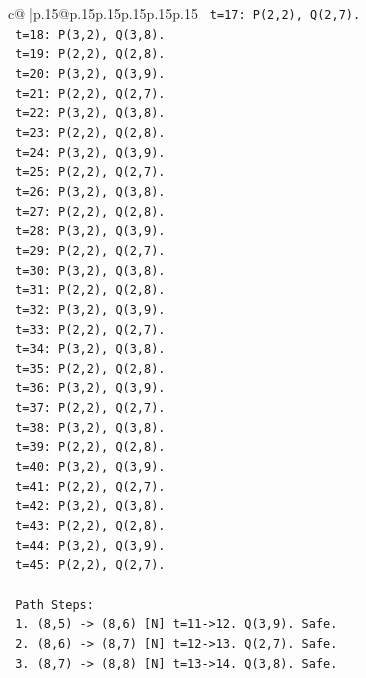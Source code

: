 \documentclass{article}
\begin{document}
{\begin{supertabular}{c@{$\;$}|p{.15\linewidth}@{}p{.15\linewidth}p{.15\linewidth}p{.15\linewidth}p{.15\linewidth}p{.15\linewidth}}
{{{\texttt{  t=17: P(2,2), Q(2,7).} \\
\texttt{  t=18: P(3,2), Q(3,8).} \\
\texttt{  t=19: P(2,2), Q(2,8).} \\
\texttt{  t=20: P(3,2), Q(3,9).} \\
\texttt{  t=21: P(2,2), Q(2,7).} \\
\texttt{  t=22: P(3,2), Q(3,8).} \\
\texttt{  t=23: P(2,2), Q(2,8).} \\
\texttt{  t=24: P(3,2), Q(3,9).} \\
\texttt{  t=25: P(2,2), Q(2,7).} \\
\texttt{  t=26: P(3,2), Q(3,8).} \\
\texttt{  t=27: P(2,2), Q(2,8).} \\
\texttt{  t=28: P(3,2), Q(3,9).} \\
\texttt{  t=29: P(2,2), Q(2,7).} \\
\texttt{  t=30: P(3,2), Q(3,8).} \\
\texttt{  t=31: P(2,2), Q(2,8).} \\
\texttt{  t=32: P(3,2), Q(3,9).} \\
\texttt{  t=33: P(2,2), Q(2,7).} \\
\texttt{  t=34: P(3,2), Q(3,8).} \\
\texttt{  t=35: P(2,2), Q(2,8).} \\
\texttt{  t=36: P(3,2), Q(3,9).} \\
\texttt{  t=37: P(2,2), Q(2,7).} \\
\texttt{  t=38: P(3,2), Q(3,8).} \\
\texttt{  t=39: P(2,2), Q(2,8).} \\
\texttt{  t=40: P(3,2), Q(3,9).} \\
\texttt{  t=41: P(2,2), Q(2,7).} \\
\texttt{  t=42: P(3,2), Q(3,8).} \\
\texttt{  t=43: P(2,2), Q(2,8).} \\
\texttt{  t=44: P(3,2), Q(3,9).} \\
\texttt{  t=45: P(2,2), Q(2,7).} \\
\\ 
\texttt{  Path Steps:} \\
\texttt{  1. (8,5) {-}> (8,6) {[}N{]} t=11{-}>12. Q(3,9). Safe.} \\
\texttt{  2. (8,6) {-}> (8,7) {[}N{]} t=12{-}>13. Q(2,7). Safe.} \\
\texttt{  3. (8,7) {-}> (8,8) {[}N{]} t=13{-}>14. Q(3,8). Safe.} \\
}}}
\end{supertabular}}
\end{document}
